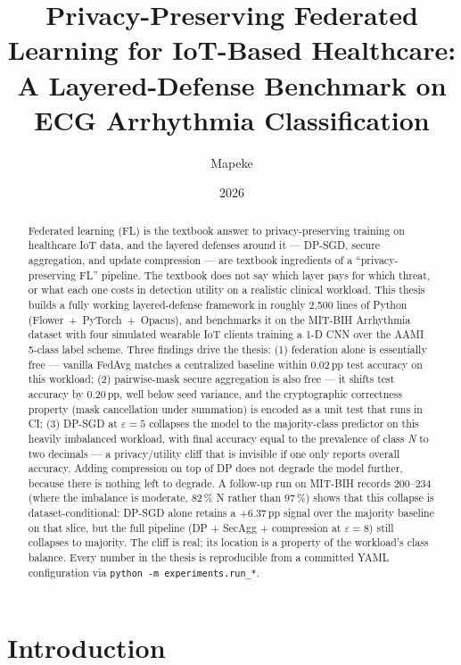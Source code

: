 \documentclass[11pt,a4paper]{report}
\title{Privacy-Preserving Federated Learning for IoT-Based Healthcare:\\
A Layered-Defense Benchmark on ECG Arrhythmia Classification}
\author{Mapeke}
\date{2026}
\begin{document}
\maketitle

\begin{abstract}
\noindent
Federated learning (FL) is the textbook answer to privacy-preserving training on
healthcare IoT data, and the layered defenses around it --- DP-SGD, secure
aggregation, and update compression --- are textbook ingredients of a
``privacy-preserving FL'' pipeline. The textbook does not say which layer pays
for which threat, or what each one costs in detection utility on a realistic
clinical workload. This thesis builds a fully working layered-defense framework
in roughly 2{,}500 lines of Python (Flower~+~PyTorch~+~Opacus), and benchmarks it
on the MIT-BIH Arrhythmia dataset with four simulated wearable IoT clients
training a 1-D CNN over the AAMI 5-class label scheme. Three findings drive the
thesis: (1) federation alone is essentially free --- vanilla FedAvg matches a
centralized baseline within 0.02\,pp test accuracy on this workload; (2) pairwise-mask
secure aggregation is also free --- it shifts test accuracy by 0.20\,pp, well below
seed variance, and the cryptographic correctness property (mask cancellation under
summation) is encoded as a unit test that runs in CI; (3) DP-SGD at $\varepsilon = 5$
collapses the model to the majority-class predictor on this heavily imbalanced
workload, with final accuracy equal to the prevalence of class \emph{N} to
two decimals --- a privacy/utility cliff that is invisible if one only
reports overall accuracy. Adding compression on top of DP does not degrade
the model further, because there is nothing left to degrade.
A follow-up run on MIT-BIH records 200--234 (where the imbalance is moderate,
82\,\% N rather than 97\,\%) shows that this collapse is dataset-conditional:
DP-SGD alone retains a $+6.37$\,pp signal over the majority baseline on that
slice, but the full pipeline (DP + SecAgg + compression at $\varepsilon = 8$)
still collapses to majority. The cliff is real; its location is a property of
the workload's class balance.
Every number in the thesis is reproducible from a committed YAML configuration via
\texttt{python -m experiments.run\_*}.
\end{abstract}

\tableofcontents

\chapter{Introduction}\label{ch:intro}
\end{document}
